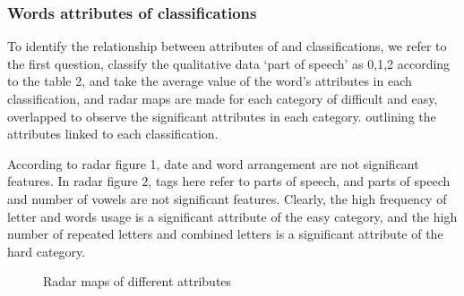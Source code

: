 \documentclass[
  journal=medium,
  manuscript=Report,
  year=2023,
  volume=37,
]{cup-journal}
\begin{document}
\subsubsection{Words attributes of classifications}

To identify the relationship between attributes of and classifications, we refer to the first question, classify the qualitative data ‘part of speech’ as 0,1,2 according to the table 2, and take the average value of the word’s attributes in each classification, and radar maps are made for each category of difficult and easy, overlapped to observe the significant attributes in each category. outlining the attributes linked to each classification.

According to radar figure 1, date and word arrangement are not significant features. In radar figure 2, tags here refer to parts of speech, and parts of speech and number of vowels are not significant features. Clearly, the high frequency of letter and words usage is a significant attribute of the easy category, and the high number of repeated letters and combined letters is a significant attribute of the hard category.

\begin{figure}[!htbp]
    \centering
    \hfill
    \caption{Radar maps of different attributes}
    \label{combine6}
\end{figure}
\end{document}
